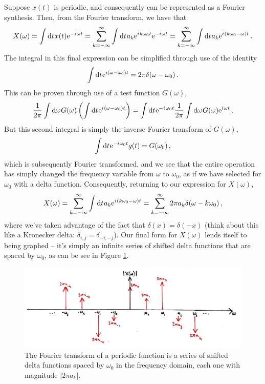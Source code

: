 Suppose $x(t)$ is periodic, and consequently can be represented as a Fourier synthesis.
Then, from the Fourier transform, we have that
%
\begin{displaymath}
  X(\omega) = \int\mathrm{d}t\mkern1mux(t)\mathrm{e}^{-{i\mkern1mu}\omega t}
  = \sum_{k=-\infty}^\infty\int\mathrm{d}t\mkern1mua_k\mathrm{e}^{{i\mkern1mu} k\omega_0 t}\mathrm{e}^{-{i\mkern1mu}\omega t}
  = \sum_{k=-\infty}^\infty \int\mathrm{d}t\mkern1mua_k\mathrm{e}^{{i\mkern1mu} (k\omega_0 - \omega) t} \,.
\end{displaymath}
%
The integral in this final expression can be simplified through use of the identity
%
\begin{displaymath}
  \int\mathrm{d}t\mkern1mu\mathrm{e}^{i(\omega - \omega_0)t} = 2\pi\delta(\omega - \omega_0) \,.
\end{displaymath}
%
This can be proven through use of a test function $G(\omega)$,
%
\begin{displaymath}
  \frac{1}{2\pi}\int\mathrm{d}\omega\mkern1mu G(\omega)\left(
    \int\mathrm{d}t\mkern1mu\mathrm{e}^{{i\mkern1mu}(\omega-\omega_0)t}
  \right)  = \int\mathrm{d}t\mkern1mu\mathrm{e}^{-{i\mkern1mu}\omega_0 t} \frac{1}{2\pi}\int\mathrm{d}\omega\mkern1mu G(\omega)\mathrm{e}^{{i\mkern1mu}\omega t} \,.
\end{displaymath}
%
But this second integral is simply the inverse Fourier transform of $G(\omega)$,
%
\begin{displaymath}
  \int\mathrm{d}t\mkern1mu\mathrm{e}^{-{i\mkern1mu}\omega_0 t} g(t) = G(\omega_0) \,,
\end{displaymath}
%
which is subsequently Fourier transformed, and we see that the entire operation
has simply changed the frequency variable from $\omega$ to $\omega_0$, as if
we have selected for $\omega_0$ with a delta function. Consequently, returning to
our expression for $X(\omega)$,
%
\begin{displaymath}
  X(\omega) = \sum_{k=-\infty}^\infty \int\mathrm{d}t\mkern1mua_k\mathrm{e}^{{i\mkern1mu} (k\omega_0 - \omega) t}
  = \sum_{k=-\infty}^\infty 2\pi a_k \delta(\omega - k\omega_0) \,,
\end{displaymath}
%
where we've taken advantage of the fact that $\delta(x) = \delta(-x)$ (think about
this like a Kronecker delta: $\delta_{i,j} = \delta_{-i,-j}$). Our final form for
$X(\omega)$ lends itself to being graphed -- it's simply an infinite series of shifted
delta functions that are spaced by $\omega_0$, as can be see in Figure
\ref{fig::lecture_5_fourier_deltas}.
%
\begin{figure}[H]
  \includegraphics[width=\textwidth]{images/lecture_5_fourier_deltas.JPG}
  \caption{
    The Fourier transform of a periodic function is a series of shifted
    delta functions spaced by $\omega_0$ in the frequency domain, each one
    with magnitude $|2\pi a_k|$.
  }
  \label{fig::lecture_5_fourier_deltas}
\end{figure}

